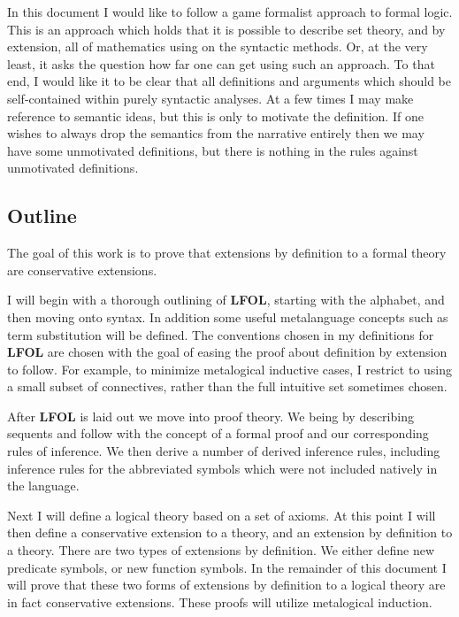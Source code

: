 \documentclass[12pt]{article}
\begin{document}
In this document I would like to follow a game formalist approach to formal logic.
This is an approach which holds that it is possible to describe set theory, and by extension, all of mathematics using on the syntactic methods.
Or, at the very least, it asks the question how far one can get using such an approach.
To that end, I would like it to be clear that all definitions and arguments which should be self-contained within purely syntactic analyses.
At a few times I may make reference to semantic ideas, but this is only to motivate the definition.
If one wishes to always drop the semantics from the narrative entirely then we may have some unmotivated definitions, but there is nothing in the rules against unmotivated definitions.

\subsection{Outline}

The goal of this work is to prove that extensions by definition to a formal theory are conservative extensions.

I will begin with a thorough outlining of \textbf{LFOL}, starting with the alphabet, and then moving onto syntax.
In addition some useful metalanguage concepts such as term substitution will be defined.
The conventions chosen in my definitions for \textbf{LFOL} are chosen with the goal of easing the proof about definition by extension to follow.
For example, to minimize metalogical inductive cases, I restrict to using a small subset of connectives, rather than the full intuitive set sometimes chosen.

After \textbf{LFOL} is laid out we move into proof theory.
We being by describing sequents and follow with the concept of a formal proof and our corresponding rules of inference.
We then derive a number of derived inference rules, including inference rules for the abbreviated symbols which were not included natively in the language.

Next I will define a logical theory based on a set of axioms.
At this point I will then define a conservative extension to a theory, and an extension by definition to a theory.
There are two types of extensions by definition.
We either define new predicate symbols, or new function symbols.
In the remainder of this document I will prove that these two forms of extensions by definition to a logical theory are in fact conservative extensions.
These proofs will utilize metalogical induction.
\end{document}
